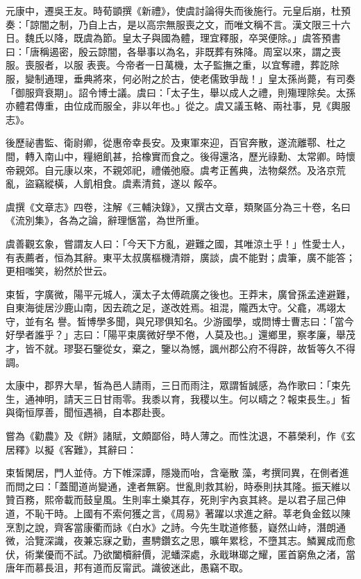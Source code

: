 \begin{pinyinscope}
 元康中，遷吳王友。時荀顗撰《新禮》，使虞討論得失而後施行。元皇后崩，杜預奏：「諒闇之制，乃自上古，是以高宗無服喪之文，而唯文稱不言。漢文限三十六日。魏氏以降，既虞為節。皇太子與國為體，理宜釋服，卒哭便除。」虞答預書曰：「唐稱遏密，殷云諒闇，各舉事以為名，非既葬有殊降。周室以來，謂之喪服。喪服者，以服
 表喪。今帝者一日萬機，太子監撫之重，以宜奪禮，葬訖除服，變制通理，垂典將來，何必附之於古，使老儒致爭哉！」皇太孫尚薨，有司奏「御服齊衰期」。詔令博士議。虞曰：「太子生，舉以成人之禮，則殤理除矣。太孫亦體君傳重，由位成而服全，非以年也。」從之。虞又議玉輅、兩社事，見《輿服志》。



 後歷祕書監、衛尉卿，從惠帝幸長安。及東軍來迎，百官奔散，遂流離鄠、杜之間，轉入南山中，糧絕飢甚，拾橡實而食之。後得還洛，歷光祿勳、太常卿。時懷帝親郊。自元康以來，不親郊祀，禮儀弛廢。虞考正舊典，法物粲然。及洛京荒亂，盜竊縱橫，人飢相食。虞素清貧，遂以
 餒卒。



 虞撰《文章志》四卷，注解《三輔決錄》，又撰古文章，類聚區分為三十卷，名曰《流別集》，各為之論，辭理愜當，為世所重。



 虞善觀玄象，嘗謂友人曰：「今天下方亂，避難之國，其唯涼土乎！」性愛士人，有表薦者，恒為其辭。東平太叔廣樞機清辯，廣談，虞不能對；虞筆，廣不能答；更相嗤笑，紛然於世云。



 束皙，字廣微，陽平元城人，漢太子太傅疏廣之後也。王莽末，廣曾孫孟達避難，自東海徙居沙鹿山南，因去疏之足，遂改姓焉。祖混，隴西太守。父龕，馮翊太守，並有名
 譽。皙博學多聞，與兄璆俱知名。少游國學，或問博士曹志曰：「當今好學者誰乎？」志曰：「陽平束廣微好學不倦，人莫及也。」還鄉里，察孝廉，舉茂才，皆不就。璆娶石鑒從女，棄之，鑒以為憾，諷州郡公府不得辟，故皙等久不得調。



 太康中，郡界大旱，皙為邑人請雨，三日而雨注，眾謂皙誠感，為作歌曰：「束先生，通神明，請天三日甘雨零。我黍以育，我稷以生。何以疇之？報束長生。」皙與衛恒厚善，聞恒遇禍，自本郡赴喪。



 嘗為《勸農》及《餅》諸賦，文頗鄙俗，時人薄之。而性沈退，不慕榮利，作《玄居釋》以擬《客難》，其辭曰：



 束皙閑居，門人並侍。方下帷深譚，隱幾而咍，含毫散
 藻，考撰同異，在側者進而問之曰：「蓋聞道尚變通，達者無窮。世亂則救其紛，時泰則扶其隆。振天維以贊百務，熙帝載而鼓皇風。生則率土樂其存，死則宇內哀其終。是以君子屈己伸道，不恥干時。上國有不索何獲之言，《周易》著躍以求進之辭。莘老負金鉉以陳烹割之說，齊客當康衢而詠《白水》之詩。今先生耽道修藝，嶷然山峙，潛朗通微，洽覽深識，夜兼忘寐之勤，晝騁鑽玄之思，曠年累稔，不墮其志。鱗翼成而愈伏，術業優而不試。乃欲闔櫝辭價，泥蟠深處，永戢琳瑯之耀，匿首窮魚之渚，當唐年而慕長沮，邦有道而反甯武。識彼迷此，愚竊不取。




\end{pinyinscope}
